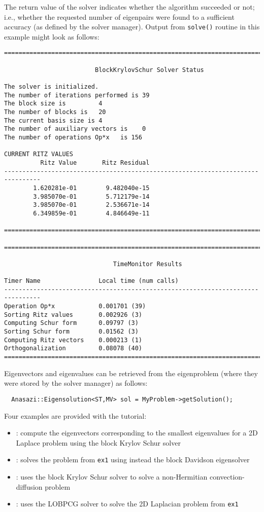 The return value of the solver indicates whether the algorithm succeeded or not; i.e.,
whether the requested number of eigenpairs were found to a sufficient accuracy (as defined
by the solver manager).
Output from \verb!solve()! routine in this example might look as follows:
\begin{verbatim}
================================================================================

                         BlockKrylovSchur Solver Status

The solver is initialized.
The number of iterations performed is 39
The block size is         4
The number of blocks is   20
The current basis size is 4
The number of auxiliary vectors is    0
The number of operations Op*x   is 156

CURRENT RITZ VALUES             
          Ritz Value       Ritz Residual
--------------------------------------------------------------------------------
        1.620281e-01        9.482040e-15
        3.985070e-01        5.712179e-14
        3.985070e-01        2.536671e-14
        6.349859e-01        4.846649e-11

================================================================================

================================================================================

                              TimeMonitor Results

Timer Name                Local time (num calls)    
--------------------------------------------------------------------------------
Operation Op*x            0.001701 (39)             
Sorting Ritz values       0.002926 (3)              
Computing Schur form      0.09797 (3)               
Sorting Schur form        0.01562 (3)               
Computing Ritz vectors    0.000213 (1)              
Orthogonalization         0.08078 (40)              
================================================================================
\end{verbatim}

Eigenvectors and eigenvalues can be retrieved from the eigenproblem (where they were
stored by the solver manager) as follows:
\begin{verbatim}
  Anasazi::Eigensolution<ST,MV> sol = MyProblem->getSolution();
\end{verbatim}

Four examples are provided with the tutorial:
\begin{itemize}
\item {}: compute the eigenvectors
corresponding to the smallest eigenvalues for a 2D Laplace problem using the block
Krylov Schur solver
\item {}: solves the problem from \verb!ex1! 
using instead the block Davidson eigensolver
\item {}: uses the block Krylov Schur solver to solve a
  non-Hermitian convection-diffusion problem
\item {}: uses the LOBPCG solver to solve the 2D Laplacian
problem from \verb!ex1!
\end{itemize}

